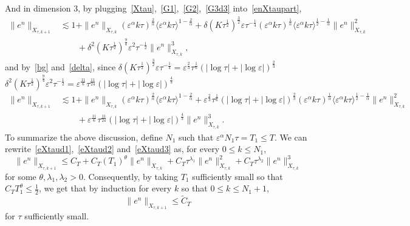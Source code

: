 \documentclass[10pt,a4paper]{article}
\begin{document}
  And in dimension \(3\), by plugging~\eqref{Xtau},~\eqref{G1},~\eqref{G2},~\eqref{G3d3} 
  into~\eqref{enXtaupart}, 
  \begin{equation*}
    \begin{aligned}
      \|e^n\|_{X_{\tau,k+1}} &\lesssim 1 + \|e^n\|_{X_{\tau,k}} 
      (\varepsilon^\alpha k\tau)^\frac2\alpha \langle\varepsilon^\alpha k\tau\rangle^{1-\frac2\alpha} %
      + \delta(K\tau^\frac12)^\frac32 \varepsilon\tau^{-\frac14} (\varepsilon^\alpha k\tau)^\frac1\alpha
      \langle\varepsilon^\alpha k\tau\rangle^{\frac12-\frac1\alpha} \|e^n\|_{X_{\tau,k}}^2 \\
      & \qquad + \delta^2(K\tau^\frac12)^\frac94 \varepsilon^2 \tau^{-\frac12}
      \|e^n\|_{X_{\tau,k}}^3 , 
    \end{aligned}
  \end{equation*}
  and by~\eqref{bg} and~\eqref{delta}, since
  \(\delta(K\tau^\frac12)^\frac32 \varepsilon\tau^{-\frac14} = 
  \varepsilon^\frac23\tau^\frac16(|\log\tau|+|\log\varepsilon|)^\frac23\)
  \(\delta^2(K\tau^\frac12)^\frac94 \varepsilon^2 \tau^{-\frac12} = 
  \varepsilon^\frac{11}6\tau^\frac{11}{24}(|\log\tau|+|\log\varepsilon|)^\frac43\)
  \begin{equation}\label{eXtaud3}
    \begin{aligned}
      \|e^n\|_{X_{\tau,k+1}} &\lesssim 1 + \|e^n\|_{X_{\tau,k}} 
      (\varepsilon^\alpha k\tau)^\frac2\alpha \langle\varepsilon^\alpha k\tau\rangle^{1-\frac2\alpha} %
      + \varepsilon^\frac23\tau^\frac16(|\log\tau|+|\log\varepsilon|)^\frac23 
      (\varepsilon^\alpha k\tau)^\frac1\alpha
      \langle\varepsilon^\alpha k\tau\rangle^{\frac12-\frac1\alpha} \|e^n\|_{X_{\tau,k}}^2 \\
      & \qquad + \varepsilon^\frac{11}6\tau^\frac{11}{24}(|\log\tau|+|\log\varepsilon|)^\frac43 
      \|e^n\|_{X_{\tau,k}}^3 .
    \end{aligned}
  \end{equation}
  To summarize the above discussion, define \(N_1\) such that 
  \(\varepsilon^\alpha N_1\tau = T_1 \leq T\). We can rewrite~\eqref{eXtaud1},~\eqref{eXtaud2} 
  and~\eqref{eXtaud3} as, for every \( 0 \leq k \leq N_1 \),
  \begin{equation}\label{enXtau0k}
    \|e^n\|_{X_{\tau,k+1}} \leq C_T + C_T (T_1)^{\theta} \|e^n\|_{X_{\tau,k}} 
    + C_T \tau^{\lambda_1} \|e^n\|_{X_{\tau,k}}^2 
    + C_T \tau^{\lambda_2} \|e^n\|_{X_{\tau,k}}^3
  \end{equation}
  for some \(\theta,\lambda_1,\lambda_2 > 0 \).
  Consequently, by taking \(T_1\) sufficiently small so that \(C_T T_1^{\theta} 
  \leq \frac12 \), we get that by induction for every \(k\) so that 
  \(0 \leq k \leq N_1 + 1\),
  \[ \|e^n\|_{X_{\tau,k+1}} \leq \widetilde C_T \]
  for \(\tau\) sufficiently small.
\end{document}
